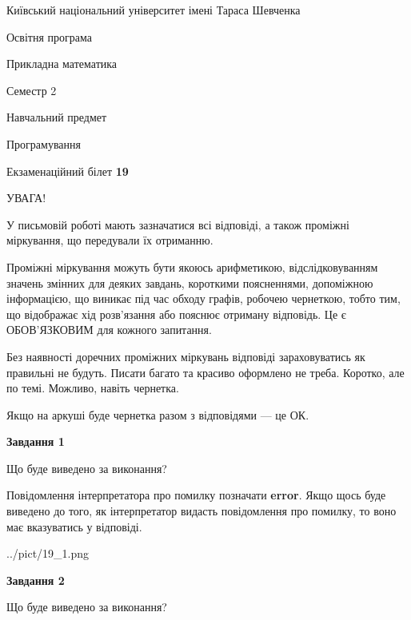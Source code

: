 \documentclass[12pt, ukrainian]{article}
\begin{document}
{{\begin {small}\par
{ \center  Київський національний університет імені Тараса Шевченка \par}
{\parbox {5 cm}{Освітня програма \hfill}{\parbox {7 cm}{Прикладна математика \hfill}}\parbox {6 cm}{\hfill Семестр 2}}\par
{\parbox {5 cm} {Навчальний предмет \hfill}\parbox {7 cm}{Програмування \hfill}\parbox {6cm}{\hfill}\par}\vspace{-7pt} \end{small}}{\center Екзаменаційний білет \No \textbf
{ 19 }\par}}
{
\begin {large}
УВАГА!

У письмовій роботі мають зазначатися всі відповіді, а також проміжні міркування, що передували їх отриманню.

Проміжні міркування можуть бути якоюсь арифметикою, відслідковуванням зна\-чень змінних для деяких завдань,
короткими поясненнями, допоміжною інформацією, що виникає під час обходу графів, робочею чернеткою,
тобто тим, що відображає хід розв’язання або пояснює отриману відповідь.
Це є ОБОВ’ЯЗКОВИМ для кожного запитання.

Без наявності доречних проміжних міркувань відповіді зараховуватись як правиль\-ні не будуть.
Писати багато та красиво оформлено не треба. Коротко, але по темі. Можли\-во, навіть чернетка.

Якщо на аркуші буде чернетка разом з відповідями --- це ОК.

\newpage

{\begin {center}\textbf{Завдання 1}\end {center}}\par
Що буде виведено за виконання?

Повідомлення інтерпретатора про помилку позначати \textbf{error}.
Якщо щось буде виведено до того, як інтерпретатор видасть повідомлення про помилку, 
то воно має вказуватись у відповіді. \par


\begin{center}
	{../pict/19_1.png}
\end{center}
\newpage

{\begin {center}\textbf{Завдання 2}\end {center}}\par
Що буде виведено за виконання?


\end{large}}
\end{document}
